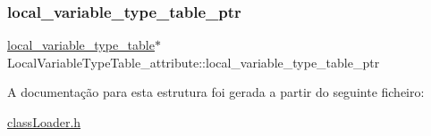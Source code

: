 \hypertarget{struct_local_variable_type_table__attribute_af7140cde866901debb62cdc0ebd88483}{}\label{struct_local_variable_type_table__attribute_af7140cde866901debb62cdc0ebd88483} 
\subsubsection{\texorpdfstring{local\+\_\+variable\+\_\+type\+\_\+table\+\_\+ptr}{local\_variable\_type\_table\_ptr}}
{\footnotesize\ttfamily \hyperlink{structlocal__variable__type__table}{local\+\_\+variable\+\_\+type\+\_\+table}$\ast$ Local\+Variable\+Type\+Table\+\_\+attribute\+::local\+\_\+variable\+\_\+type\+\_\+table\+\_\+ptr}



A documentação para esta estrutura foi gerada a partir do seguinte ficheiro\+:\begin{DoxyCompactItemize}
\item 
\hyperlink{class_loader_8h}{class\+Loader.\+h}\end{DoxyCompactItemize}
